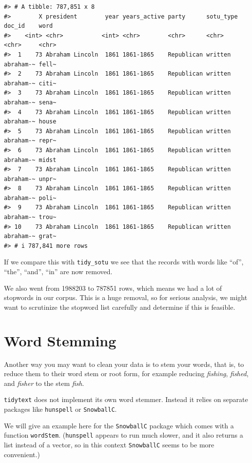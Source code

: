 \documentclass[
]{book}
\begin{document}
\begin{verbatim}
#> # A tibble: 787,851 x 8
#>        X president        year years_active party      sotu_type doc_id    word 
#>    <int> <chr>           <int> <chr>        <chr>      <chr>     <chr>     <chr>
#>  1    73 Abraham Lincoln  1861 1861-1865    Republican written   abraham-~ fell~
#>  2    73 Abraham Lincoln  1861 1861-1865    Republican written   abraham-~ citi~
#>  3    73 Abraham Lincoln  1861 1861-1865    Republican written   abraham-~ sena~
#>  4    73 Abraham Lincoln  1861 1861-1865    Republican written   abraham-~ house
#>  5    73 Abraham Lincoln  1861 1861-1865    Republican written   abraham-~ repr~
#>  6    73 Abraham Lincoln  1861 1861-1865    Republican written   abraham-~ midst
#>  7    73 Abraham Lincoln  1861 1861-1865    Republican written   abraham-~ unpr~
#>  8    73 Abraham Lincoln  1861 1861-1865    Republican written   abraham-~ poli~
#>  9    73 Abraham Lincoln  1861 1861-1865    Republican written   abraham-~ trou~
#> 10    73 Abraham Lincoln  1861 1861-1865    Republican written   abraham-~ grat~
#> # i 787,841 more rows
\end{verbatim}

If we compare this with \texttt{tidy\_sotu} we see that the records with words like ``of'', ``the'', ``and'', ``in'' are now removed.

We also went from 1988203 to 787851 rows, which means we had a lot of stopwords in our corpus. This is a huge removal, so for serious analysis, we might want to scrutinize the stopword list carefully and determine if this is feasible.

\section{Word Stemming}\label{word-stemming}

Another way you may want to clean your data is to stem your words, that is, to reduce them to their word stem or root form, for example reducing \emph{fishing}, \emph{fished}, and \emph{fisher} to the stem \emph{fish}.

\texttt{tidytext} does not implement its own word stemmer. Instead it relies on separate packages like \texttt{hunspell} or \texttt{SnowballC}.

We will give an example here for the \texttt{SnowballC} package which comes with a function \texttt{wordStem}. (\texttt{hunspell} appears to run much slower, and it also returns a list instead of a vector, so in this context \texttt{SnowballC} seems to be more convenient.)
\end{document}
